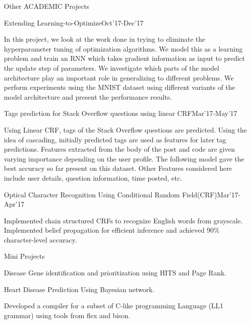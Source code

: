 \documentclass{resume} %
\begin{document}
\begin{rSection}{Other ACADEMIC Projects}
\begin{rSubsection}{Extending Learning-to-Optimize}{Oct'17-Dec'17}{}{}
\item  In this project, we look at the work done in trying to eliminate the hyperparameter tuning of optimization algorithms. We model this as a learning problem and train an RNN which takes gradient information as input to predict the update step of parameters. We investigate which parts of the model architecture play an important role in generalizing to different problems. We perform experiments using the MNIST dataset using different variants of the model architecture and present the performance results. 
\end{rSubsection}
\vspace*{-3mm}
\begin{rSubsection}{ Tags prediction for Stack Overflow questions using linear CRF}{Mar'17-May'17}{ }{}
\item Using Linear CRF, tags of the Stack Overflow questions are predicted. Using the idea of cascading, initially predicted tags are used as features for later tag predictions. Features extracted from the body of the post and code are given varying importance depending on the user profile. The following model gave the best accuracy so far present on this dataset. Other Features considered here include user details, question information, time posted, etc. 
\end{rSubsection}
\vspace*{-3mm}
\begin{rSubsection}{ Optical  Character  Recognition  Using  Conditional  Random  Field(CRF)}{Mar'17-Apr'17}{ }{}
\item Implemented chain structured CRFs to recognize English words from grayscale.  Implemented belief propagation for efficient inference and achieved 90\% character-level accuracy.
\end{rSubsection}
\vspace*{-3mm}
\begin{rSubsection}{ Mini Projects}{}{ }{}
\item Disease Gene identification and prioritization  using HITS and Page Rank.
\item Heart Disease Prediction Using Bayesian network.
\item  Developed a compiler for a subset of C-like programming Language (LL1 grammar) using tools from flex and bison.
\end{rSubsection}

\end{rSection}
\end{document}
